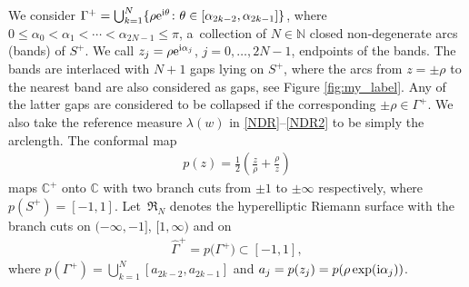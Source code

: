 \documentclass[pdftex]{sigma}
\numberwithin{equation}{section}
\newcommand{\G}{\Gamma}
\def\C{{\mathbb C}}
\def\N{{\mathbb N}}
\def\a{\alpha}
\def\l{\lambda}
\def\hf{\frac{1}{2}}
\def\l{\lambda}
\def\G{\Gamma}
\begin{document}
We consider $\G^+=\bigcup_{k=1}^N\{\rho {\rm e}^{{\rm i}\theta}\colon \theta\in [\alpha_{2k-2},\alpha_{2k-1}]\}$, where $0\leq \a_0 < \a_1<\cdots<\a_{2N-1}{\leq \pi}$,
a~collection
of $N\in \N$ closed non-degenerate arcs (bands) of $S^+$.
We call $z_j=\rho {\rm e}^{{\rm i}\a_j}$, $j=0,\dots,2N-1$, endpoints of the bands. %
The bands are interlaced with $N+1$ gaps lying on $S^+$, where the arcs from $z=\pm\rho$ to the nearest band are also considered as gaps, see Figure \ref{fig:my_label}. Any of the latter gaps are considered to be collapsed if the corresponding $\pm\rho\in\G^+$. We also take the reference measure $\l(w)$ in \eqref{NDR}--\eqref{NDR2} to be simply the arclength. The conformal map
\begin{gather}\label{conf-map-p}
p(z)=\hf\left(\frac z\rho+\frac \rho z\right)
\end{gather}
maps $\C^+$ onto $\C$ with two branch cuts from $\pm 1$ to $\pm\infty $ respectively,
where $p(S^+)=[-1,1]$. Let~$\mathfrak R_N$ denotes the hyperelliptic Riemann surface with the branch cuts on $(-\infty,-1]$, $[1,\infty)$ and on
\begin{gather*}
\hat \G^+=p\bigl(\G^+\bigr)\subset [-1,1],
\end{gather*}
where
$p(\G^+)=\bigcup_{k=1}^N[a_{2k-2},a_{2k-1}]$ and $a_j=p(z_j)=p(\rho\exp({\rm i}\a_j))$.
\end{document}
